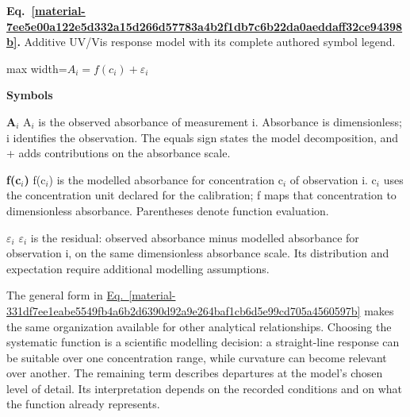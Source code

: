 \documentclass[11pt,a4paper]{article}
\begin{document}
\par\medskip
\noindent\begin{minipage}{\linewidth}
\label{material-7ee5e00a122e5d332a15d266d57783a4b2f1db7c6b22da0aeddaff32ce94398b}
\noindent\textbf{Eq.~\ref*{material-7ee5e00a122e5d332a15d266d57783a4b2f1db7c6b22da0aeddaff32ce94398b}.} Additive UV/Vis response model with its complete authored symbol legend.\par\nopagebreak
\begin{center}\begin{adjustbox}{max width=\linewidth}$\displaystyle A_i = f(c_i) + \varepsilon_i$\end{adjustbox}\end{center}

\par\noindent\textbf{Symbols}

\par\noindent\textbf{A\ensuremath{{}_i}} A\ensuremath{{}_i} is the observed absorbance of measurement i. Absorbance is dimensionless; i identifies the observation. The equals sign states the model decomposition, and + adds contributions on the absorbance scale.

\par\noindent\textbf{f(c\ensuremath{{}_i})} f(c\ensuremath{{}_i}) is the modelled absorbance for concentration c\ensuremath{{}_i} of observation i. c\ensuremath{{}_i} uses the concentration unit declared for the calibration; f maps that concentration to dimensionless absorbance. Parentheses denote function evaluation.

\par\noindent\textbf{\ensuremath{\varepsilon}\ensuremath{{}_i}} \ensuremath{\varepsilon}\ensuremath{{}_i} is the residual: observed absorbance minus modelled absorbance for observation i, on the same dimensionless absorbance scale. Its distribution and expectation require additional modelling assumptions.

\end{minipage}\par
\medskip

The general form in \hyperref[material-331df7ee1eabe5549fb4a6b2d6390d92a9e264baf1cb6d5e99cd705a4560597b]{Eq.~\ref*{material-331df7ee1eabe5549fb4a6b2d6390d92a9e264baf1cb6d5e99cd705a4560597b}} makes the same organization available for other analytical relationships. Choosing the systematic function is a scientific modelling decision: a straight-line response can be suitable over one concentration range, while curvature can become relevant over another. The remaining term describes departures at the model's chosen level of detail. Its interpretation depends on the recorded conditions and on what the function already represents.
\end{document}
